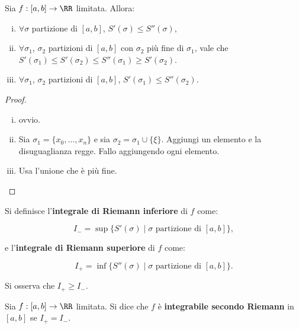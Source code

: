\documentclass[11pt]{article}
\begin{document}
	\begin{proposition}
		Sia $f : [a, b] \to \RR$ limitata. Allora:
		
		\begin{enumerate}[(i)]
			\item $\forall \sigma$ partizione di $[a, b]$, $S'(\sigma) \leq S''(\sigma)$,

			\item $\forall \sigma_1$, $\sigma_2$ partizioni di $[a, b]$
			con $\sigma_2$ più fine di $\sigma_1$, vale che
			$S'(\sigma_1) \leq S'(\sigma_2) \leq S''(\sigma_1) \geq S'(\sigma_2)$.
			
			\item $\forall \sigma_1$, $\sigma_2$ partizioni di $[a, b]$,
			$S'(\sigma_1) \leq S''(\sigma_2)$.
		\end{enumerate}
	\end{proposition}

	\begin{proof}
		\begin{enumerate}[(i)]
			\item ovvio.
			
			\item Sia $\sigma_1 = \{ x_0, \ldots, x_n \}$ e sia
			$\sigma_2 = \sigma_1 \cup \{ \xi \}$. Aggiungi un elemento
			e la disuguaglianza regge. Fallo aggiungendo ogni elemento.
	
			\item Usa l'unione che è più fine.
		\end{enumerate}
	\end{proof}

	\begin{definition} 
		Si definisce l'\textbf{integrale di Riemann inferiore} di $f$ come:
		
		\[ I_- = \sup \{ S'(\sigma) \mid \sigma \text{ partizione di } [a, b] \}, \]
		
		e l'\textbf{integrale di Riemann superiore} di $f$ come:
		
		\[ I_+ = \inf \{ S''(\sigma) \mid \sigma \text{ partizione di } [a, b] \}. \]
	\end{definition}

	\begin{remark}
		Si osserva che $I_+ \geq I_-$.
	\end{remark}

	\begin{definition} 
		Sia $f : [a, b] \to \RR$ limitata. Si dice che
		$f$ è \textbf{integrabile secondo Riemann} in $[a, b]$
		se $I_+ = I_-$.
	\end{definition}
\end{document}

